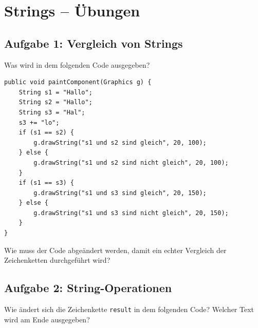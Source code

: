 \clearpage

\rehead[]{\textcolor{lightblue}{AvHG, Inf, My}}
\lohead[]{\textcolor{lightblue}{AvHG, Inf, My}}

\section{Strings -- Übungen}

\subsection{Aufgabe 1: Vergleich von Strings}

\begin{compactenum}[a)]
\item Was wird in dem folgenden Code ausgegeben?

\begin{lstlisting}
public void paintComponent(Graphics g) {
    String s1 = "Hallo";
    String s2 = "Hallo";
    String s3 = "Hal";
    s3 += "lo";
    if (s1 == s2) {
        g.drawString("s1 und s2 sind gleich", 20, 100);
    } else {
        g.drawString("s1 und s2 sind nicht gleich", 20, 100);
    }
    if (s1 == s3) {
        g.drawString("s1 und s3 sind gleich", 20, 150);
    } else {
        g.drawString("s1 und s3 sind nicht gleich", 20, 150);
    }
}
\end{lstlisting}

\item Wie muss der Code abgeändert werden, damit ein echter Vergleich der
Zeichenketten durchgeführt wird?
\end{compactenum}


\subsection{Aufgabe 2: String-Operationen}

Wie ändert sich die Zeichenkette \lstinline|result| in dem folgenden Code?
Welcher Text wird am Ende ausgegeben?

